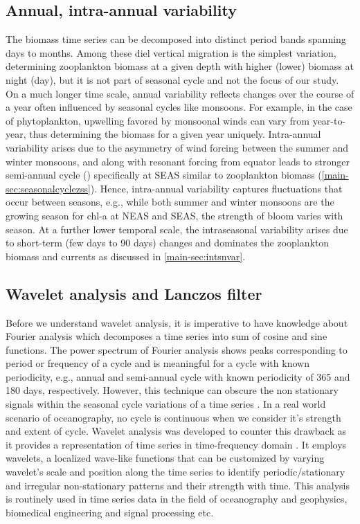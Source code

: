 \documentclass{article}
\begin{document}
	\subsection{Annual, intra-annual variability}
	\label{sec:seasonal_cycle}
	The biomass time series can be decomposed into distinct period bands spanning days to months. Among these diel vertical migration is the simplest variation, determining zooplankton biomass at a given depth with higher (lower) biomass at night (day), but it is not part of seasonal cycle and not the focus of our study. On a much longer time scale,  annual variability reflects changes over the course of a year often influenced by seasonal cycles like monsoons. For example, in the case of phytoplankton, upwelling favored by monsoonal winds can vary from year-to-year, thus determining the biomass for a given year uniquely. Intra-annual variability arises due to the asymmetry of wind forcing between the summer and winter monsoons, and along with resonant forcing from equator leads to stronger semi-annual cycle (\citep{jensen2001arabian,schott20011}) specifically at SEAS similar to zooplankton biomass (\autoref{main-sec:seasonalcyclezss}). Hence, intra-annual variability captures fluctuations that occur between seasons, e.g., while both summer and winter monsoons are the growing season for chl-a at NEAS and SEAS, the strength of bloom varies with season. At a further lower temporal scale, the intraseasonal variability arises due to short-term (few days to 90 days) changes and dominates the zooplankton biomass and currents as discussed in \autoref{main-sec:intsnvar}.
	
	\subsection{Wavelet analysis and Lanczos filter}
	\label{sec:wavelet_lanczos}
	Before we understand wavelet analysis, it is imperative to have knowledge about Fourier analysis which decomposes a time series into sum of cosine and sine functions. The power spectrum of Fourier analysis shows peaks corresponding to period or frequency of a cycle and is meaningful for a cycle with known periodicity, e.g., annual and semi-annual cycle with known periodicity of 365 and 180 days, respectively. However, this technique can obscure the non stationary signals within the seasonal cycle variations of a time series \citep{amol2014observed,chaudhuri2020observed}. In a real world scenario of oceanography, no cycle is continuous when we consider it's strength and extent of cycle. Wavelet analysis was developed to counter this drawback as it provides a representation of time series in time-frequency domain \citep{torrence1998practical}. It employs wavelets, a localized wave-like functions that can be customized by varying wavelet's scale and position along the time series to identify periodic/stationary and irregular non-stationary patterns and their strength with time. This analysis is routinely used in time series data in the field of oceanography and geophysics, biomedical engineering and signal processing etc.
	
\end{document}
